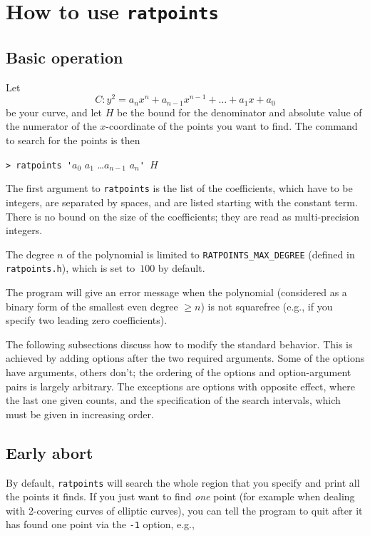 \documentclass[12pt,a4paper,oneside]{amsart}
\begin{document}

\section{How to use \texttt{ratpoints}}

\subsection{Basic operation}

Let
\[ C : y^2 = a_n x^n + a_{n-1} x^{n-1} + \dots + a_1 x + a_0 \]
be your
curve, and let $H$ be the bound for the denominator and absolute value
of the numerator of the $x$-coordinate of the points you want to find.
The command to search for the points is then

\verb+> ratpoints '+$a_0$ $a_1$ \dots $a_{n-1}$ $a_n$\verb+' +$H$

The first argument to \texttt{ratpoints} is the list of the coefficients,
which have to be integers, are separated by spaces, and are listed
starting with the constant term. There is no bound on the size of the
coefficients; they are read as multi-precision integers.

The degree $n$ of the polynomial is limited to \texttt{RATPOINTS\_MAX\_DEGREE}
(defined in \texttt{ratpoints.h}), which is set to~$100$ by default.

The program will give an error message when the polynomial (considered
as a binary form of the smallest even degree $\ge n$) is not squarefree
(e.g., if you specify two leading zero coefficients).

The following subsections discuss how to modify the standard behavior.
This is achieved by adding options after the two required arguments.
Some of the options have arguments, others don't; the ordering of
the options and option-argument pairs is largely arbitrary.
The exceptions are options with opposite effect, where the last one given counts,
and the specification of the search intervals, which must be given in increasing order.

\subsection{Early abort}

By default, \texttt{ratpoints} will search the whole region that you specify
and print all the points it finds. If you just want to find {\em one}
point (for example when dealing with 2-covering curves of elliptic curves),
you can tell the program to quit after it has found one point via the
\verb+-1+ option, e.g.,
\end{document}

